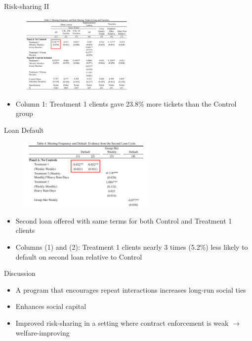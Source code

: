 \documentclass[11pt,notes=hide,aspectratio=169,mathserif]{beamer}
\begin{document}
\begin{frame}{Risk-sharing II}
\begin{figure}
    \centering
    \includegraphics[width=0.5\textwidth]{inputs/table3.png}
\end{figure}
\begin{itemize}
    \item Column 1: Treatment 1 clients gave 23.8\% more tickets than the Control group 
\end{itemize}
\end{frame}
\begin{frame}{Loan Default}
\begin{figure}
    \centering
    \includegraphics[width=0.6\textwidth]{inputs/table4.png}
\end{figure}
\begin{itemize}
    \item Second loan offered with same terms for both Control and Treatment 1 clients
    \item Columns (1) and (2): Treatment 1 clients nearly 3 times (5.2\%) less likely to default on second loan relative to Control 
\end{itemize}
\end{frame}

\begin{frame}{Discussion}
\begin{itemize}
    \item A program that encourages repeat interactions increases long-run social ties 
    \item Enhances social capital
    \item Improved risk-sharing in a setting where contract enforcement is weak $\rightarrow$ welfare-improving 
\end{itemize}
\end{frame}
\end{document}
